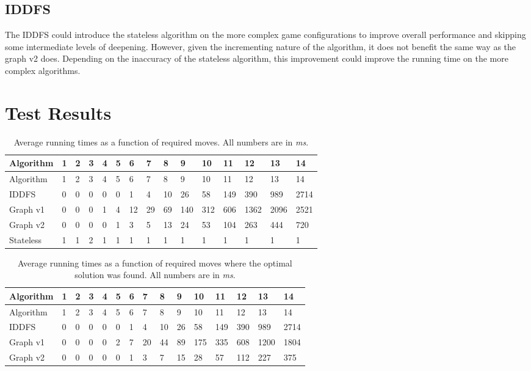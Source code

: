 \documentclass[]{article}
\begin{document}
\subsection{IDDFS}\label{iddfs-1}

The IDDFS could introduce the stateless algorithm on the more complex
game configurations to improve overall performance and skipping some
intermediate levels of deepening. However, given the incrementing nature
of the algorithm, it does not benefit the same way as the graph v2 does.
Depending on the inaccuracy of the stateless algorithm, this improvement
could improve the running time on the more complex algorithms.

\newpage

\appendix
\section{Test Results} \label{app:testdata}

\begin{longtable}[c]{@{}lllllllllllllll@{}}
\caption{Average running times as a function of required moves. All
numbers are in \emph{ms}.}\tabularnewline
\toprule
Algorithm & 1 & 2 & 3 & 4 & 5 & 6 & 7 & 8 & 9 & 10 & 11 & 12 & 13 &
14\tabularnewline
\midrule
\endfirsthead
\toprule
Algorithm & 1 & 2 & 3 & 4 & 5 & 6 & 7 & 8 & 9 & 10 & 11 & 12 & 13 &
14\tabularnewline
\midrule
\endhead
IDDFS & 0 & 0 & 0 & 0 & 0 & 1 & 4 & 10 & 26 & 58 & 149 & 390 & 989 &
2714\tabularnewline
Graph v1 & 0 & 0 & 0 & 1 & 4 & 12 & 29 & 69 & 140 & 312 & 606 & 1362 &
2096 & 2521\tabularnewline
Graph v2 & 0 & 0 & 0 & 0 & 1 & 3 & 5 & 13 & 24 & 53 & 104 & 263 & 444 &
720\tabularnewline
Stateless & 1 & 1 & 2 & 1 & 1 & 1 & 1 & 1 & 1 & 1 & 1 & 1 & 1 &
1\tabularnewline
\bottomrule
\end{longtable}

\begin{longtable}[c]{@{}lllllllllllllll@{}}
\caption{Average running times as a function of required moves where the
optimal solution was found. All numbers are in
\emph{ms}.}\tabularnewline
\toprule
Algorithm & 1 & 2 & 3 & 4 & 5 & 6 & 7 & 8 & 9 & 10 & 11 & 12 & 13 &
14\tabularnewline
\midrule
\endfirsthead
\toprule
Algorithm & 1 & 2 & 3 & 4 & 5 & 6 & 7 & 8 & 9 & 10 & 11 & 12 & 13 &
14\tabularnewline
\midrule
\endhead
IDDFS & 0 & 0 & 0 & 0 & 0 & 1 & 4 & 10 & 26 & 58 & 149 & 390 & 989 &
2714\tabularnewline
Graph v1 & 0 & 0 & 0 & 0 & 2 & 7 & 20 & 44 & 89 & 175 & 335 & 608 & 1200
& 1804\tabularnewline
Graph v2 & 0 & 0 & 0 & 0 & 0 & 1 & 3 & 7 & 15 & 28 & 57 & 112 & 227 &
375\tabularnewline
\bottomrule
\end{longtable}
\end{document}
